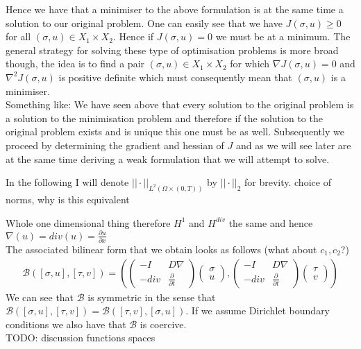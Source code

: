 \documentclass[fleqn, a4paper, 11pt, bibliography=totoc]{report}
\begin{document}
Hence we have that a minimiser to the above formulation is at the same time a solution to our original problem. One can easily see that we have $J(\sigma, u) \geq 0$ for all $(\sigma, u) \in X_1 \times X_2$. Hence if $J(\sigma, u) = 0$ we must be at a minimum. The general strategy for solving these type of optimisation problems is more broad though, the idea is to find a pair $(\sigma, u) \in X_1 \times X_2$ for which $\nabla J(\sigma,u) = 0$  and $\nabla^2 J(\sigma, u)$ is positive definite which must consequently mean that $(\sigma, u)$ is a minimiser. \\
Something like: We have seen above that every solution to the original problem is a solution to the minimisation problem and therefore if the solution to the original problem exists and is unique this one must be as well. Subsequently we proceed by determining the gradient and hessian of $J$ and as we will see later are at the same time deriving a weak formulation that we will attempt to solve. 

In the following I will denote $|| \cdot ||_{L^2(\Omega \times (0,T))}$ by $|| \cdot ||_2$ for brevity. 
choice of norms, why is this equivalent

Whole one dimensional thing therefore $H^1$ and $H^{div}$ the same and hence $\nabla(u) = div(u) = \frac{\partial u}{\partial x}$
 \\
 The associated bilinear form that we obtain looks as follows (what about $c_1, c_2$?)
 \begin{equation}
 \begin{aligned}
 \mathcal{B} ([\sigma, u], [\tau, v]) = \left( \begin{pmatrix} 
 - I & D \nabla \\
 -div & \frac{\partial}{\partial t}
 \end{pmatrix} 
 \begin{pmatrix}
 \sigma \\
 u
 \end{pmatrix}, 
 \begin{pmatrix}
  - I & D \nabla \\
 -div & \frac{\partial}{\partial t}
 \end{pmatrix}
 \begin{pmatrix}
 \tau \\
 v
 \end{pmatrix} \right)
 \end{aligned}
 \end{equation}
 We can see that $\mathcal{B}$ is symmetric in the sense that $\mathcal{B}([\sigma, u], [\tau, v]) = \mathcal{B}([\tau, v], [\sigma, u])$. If we assume Dirichlet boundary conditions we also have that $\mathcal{B}$ is coercive.  \\
TODO: discussion functions spaces
\end{document}
